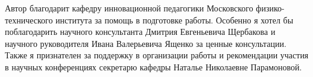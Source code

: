 Автор благодарит кафедру инновационной педагогики Московского физико-технического института за помощь 
в подготовке работы. Особенно я хотел бы поблагодарить научного консультанта Дмитрия Евгеньевича Щербакова 
и научного руководителя Ивана Валерьевича Ященко за ценные консультации.
Также я признателен за поддержку в организации работы и рекомендации участия в научных конференциях
секретарю кафедры Наталье Николаевне Парамоновой.
